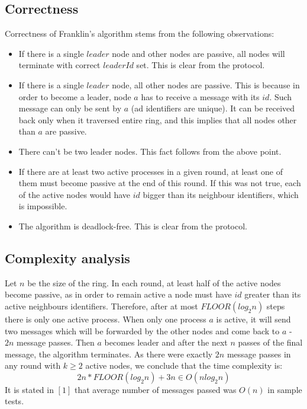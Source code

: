 \documentclass{article}
\begin{document}
\subsection*{Correctness}
Correctness of Franklin's algorithm  stems from the following observations:
\begin{itemize}
    \item If there is a single $leader$ node and other nodes are passive, all nodes will terminate with correct $leaderId$ set. This is clear from the protocol.
    \item If there is a single $leader$ node, all other nodes are passive. This is because in order to become a leader, node $a$ has to receive a message with its $id$. Such message can only be sent by $a$ (ad identifiers are unique). It can be received back only when it traversed entire ring, and this implies that all nodes other than $a$ are passive.
    \item There can't be two leader nodes. This fact follows from the above point.
    \item If there are at least two active processes in a given round, at least one of them must become passive at the end of this round. If this was not true, each of the active nodes would have $id$ bigger than its neighbour identifiers, which is impossible.
    \item The algorithm is deadlock-free. This is clear from the protocol. 
\end{itemize}

\subsection*{Complexity analysis}
Let $n$ be the size of the ring. In each round, at least half of the active nodes become passive, as in order to remain active a node must have $id$ greater than its active neighbours identifiers. Therefore, after at most $FLOOR(log_2 n)$ steps there is only one active process. When only one process $a$ is active, it will send two messages which will be forwarded by the other nodes and come back to $a$ - $2n$ message passes. Then $a$ becomes leader and after the next $n$ passes of the final message, the algorithm terminates. As there were exactly $2n$ message passes in any round with $k \ge 2$ active nodes, we conclude that the time complexity is:
$$
2n*FLOOR(log_2 n) + 3n \in O\left(n log_2 n\right)
$$
It is stated in $[1]$ that average number of messages passed was $O\left(n\right)$  in sample tests.

\printbibliography
\end{document}

